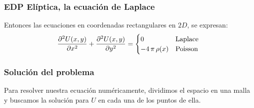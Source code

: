 \begin{frame}
\frametitle{EDP Elíptica, la ecuación de Laplace}
Entonces las ecuaciones en coordenadas rectangulares en $2D$, se expresan:
\begin{align*}
\pdv[2]{U(x,y)}{x} + \pdv[2]{U(x,y)}{y} = \begin{cases}
0 & \mbox{Laplace} \\
-4 \, \pi \, \rho(x) & \mbox{Poisson}
\end{cases}
\end{align*}
\end{frame}
\begin{frame}
\frametitle{Solución del problema}
Para resolver nuestra ecuación numéricamente, dividimos el espacio en una malla y buscamos la solución para $U$ en cada una de los puntos de ella.
\end{frame}
